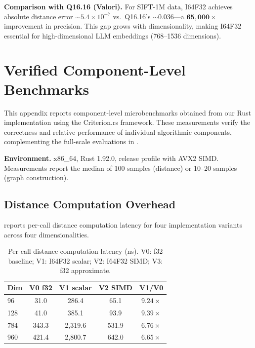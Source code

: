 \documentclass[10pt,journal,compsoc]{IEEEtran}
\begin{document}
\textbf{Comparison with Q16.16 (Valori).} For SIFT-1M data, I64F32 achieves absolute distance error $\sim 5.4 \times 10^{-7}$ vs.\ Q16.16's $\sim 0.036$---a $\mathbf{65{,}000\times}$ improvement in precision. This gap grows with dimensionality, making I64F32 essential for high-dimensional LLM embeddings (768--1536 dimensions).


\section{Verified Component-Level Benchmarks}
\label{sec:appendix_benchmarks}

This appendix reports component-level microbenchmarks obtained from our Rust implementation using the Criterion.rs framework. These measurements verify the correctness and relative performance of individual algorithmic components, complementing the full-scale evaluations in .

\textbf{Environment.} x86\_64, Rust 1.92.0, release profile with AVX2 SIMD. Measurements report the median of 100 samples (distance) or 10--20 samples (graph construction).

\subsection{Distance Computation Overhead}

 reports per-call distance computation latency for four implementation variants across four dimensionalities.

\begin{table}[h]
  \centering
  \caption{Per-call distance computation latency (ns). V0: f32 baseline; V1: I64F32 scalar; V2: I64F32 SIMD; V3: f32 approximate.}
  \label{tab:bench_distance}
  \footnotesize
  \begin{tabular}{lcccc}
    \toprule
    \textbf{Dim} & \textbf{V0 f32} & \textbf{V1 scalar} & \textbf{V2 SIMD} & \textbf{V1/V0} \\
    \midrule
    96  & 31.0 & 286.4 & 65.1 & $9.24\times$ \\
    128 & 41.0 & 385.1 & 93.9 & $9.39\times$ \\
    784 & 343.3 & 2{,}319.6 & 531.9 & $6.76\times$ \\
    960 & 421.4 & 2{,}800.7 & 642.0 & $6.65\times$ \\
    \bottomrule
  \end{tabular}
\end{table}
\end{document}

